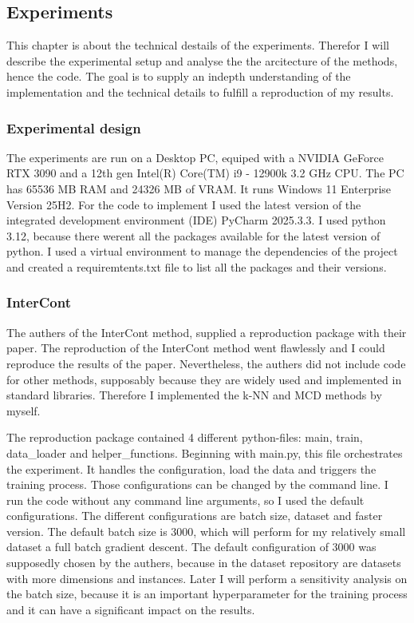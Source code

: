 
\subsection{Experiments}
This chapter is about the technical destails of the experiments.
Therefor I will describe the experimental setup and analyse the the arcitecture of the methods, hence the code.
The goal is to supply an indepth understanding of the implementation and the technical details to fulfill a reproduction of my results. 


\subsubsection*{Experimental design}
The experiments are run on a Desktop PC, equiped with a NVIDIA GeForce RTX 3090 and a 12th gen Intel(R) Core(TM) i9 - 12900k 3.2 GHz CPU.
The PC has 65536 MB RAM and 24326 MB of VRAM. 
It runs Windows 11 Enterprise Version 25H2.
For the code to implement I used the latest version of the integrated development environment (IDE) PyCharm 2025.3.3.
I used python 3.12, because there werent all the packages available for the latest version of python.
I used a virtual environment to manage the dependencies of the project and created a requiremtents.txt file to list all the packages and their versions.


\subsubsection*{InterCont}
The authers of the InterCont method, supplied a reproduction package with their paper. 
The reproduction of the InterCont method went flawlessly and I could reproduce the results of the paper.
Nevertheless, the authers did not include code for other methods, supposably because they are widely used and implemented in standard libraries.
Therefore I implemented the k-NN and MCD methods by myself.


The reproduction package contained 4 different python-files: main, train, data\_loader and helper\_functions.
Beginning with main.py, this file orchestrates the experiment. 
It handles the configuration, load the data and triggers the training process.
Those configurations can be changed by the command line.
I run the code without any command line arguments, so I used the default configurations.
The different configurations are batch size, dataset and faster version.
The default batch size is 3000, which will perform for my relatively small dataset a full batch gradient descent.
The default configuration of 3000 was supposedly chosen by the authers, because in the dataset repository are datasets with more dimensions and instances.
Later I will perform a sensitivity analysis on the batch size, because it is an important hyperparameter for the training process and it can have a significant impact on the results. 


